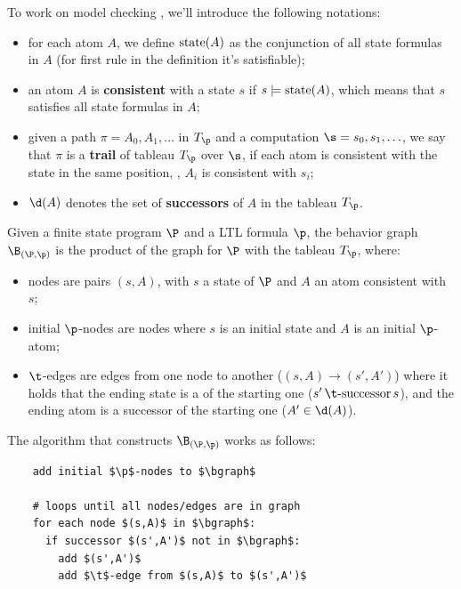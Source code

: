 \documentclass[oneside]{academica}
\begin{document}
To work on model checking , we'll introduce the following notations:
\begin{itemize}
  \item for each atom $A$, we define $\text{state}(A)$ as the conjunction of all state formulas in $A$ (for first rule in the  definition it's satisfiable);
  \item an atom $A$ is \textbf{consistent} with a state $s$ if $s \models \text{state}(A)$, which means that $s$ satisfies all state formulas in $A$;
  \item given a path $\pi = A_0,A_1,\ldots$ in $T_\p$ and a computation $\s = s_0,s_1,\ldots$, we say that $\pi$ is a \textbf{trail} of tableau $T_\p$ over $\s$, if each atom is consistent with the state in the same position, \ie, $A_i$ is consistent with $s_i$;
  \item $\d(A)$ denotes the set of \textbf{successors} of $A$ in the tableau $T_\p$.
\end{itemize}

\begin{definition*}
  Given a finite state program $\P$ and a LTL formula $\p$, the behavior graph $\bgraph$ is the product of the graph for $\P$ with the tableau $T_\p$, where:
  \begin{itemize}
    \item nodes are pairs $(s,A)$, with $s$ a state of $\P$ and $A$ an atom consistent with $s$;
    \item initial $\p$-nodes are nodes where $s$ is an initial state and $A$ is an initial $\p$-atom;
    \item $\t$-edges are edges from one node to another ($(s,A) \to (s',A')$) where it holds that the ending state is a \tsuc of the starting one ($s'\,\t\text{-successor}\, s$), and the ending atom is a successor of the starting one ($A' \in \d(A)$).
  \end{itemize}

  \bigskip
  The algorithm that constructs $\bgraph$ works as follows:
  \begin{lstlisting}
    add initial $\p$-nodes to $\bgraph$

    # loops until all nodes/edges are in graph
    for each node $(s,A)$ in $\bgraph$:
      if successor $(s',A')$ not in $\bgraph$:
        add $(s',A')$
        add $\t$-edge from $(s,A)$ to $(s',A')$
  \end{lstlisting}
\end{definition*}
\end{document}
